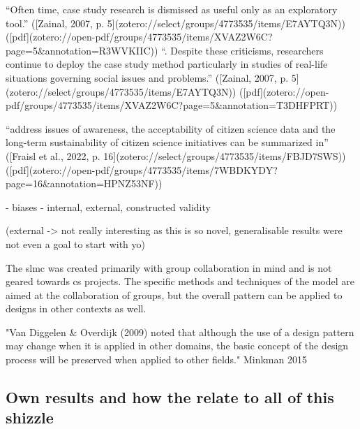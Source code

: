 “Often time, case study research is dismissed as useful only as an exploratory tool.” ([Zainal, 2007, p. 5](zotero://select/groups/4773535/items/E7AYTQ3N)) ([pdf](zotero://open-pdf/groups/4773535/items/XVAZ2W6C?page=5&annotation=R3WVKIIC)) %
“. Despite these criticisms, researchers continue to deploy the case study method particularly in studies of real-life situations governing social issues and problems.” ([Zainal, 2007, p. 5](zotero://select/groups/4773535/items/E7AYTQ3N)) ([pdf](zotero://open-pdf/groups/4773535/items/XVAZ2W6C?page=5&annotation=T3DHFPRT))


“address issues of awareness, the acceptability of citizen science data and the long-term sustainability of citizen science initiatives can be summarized in” ([Fraisl et al., 2022, p. 16](zotero://select/groups/4773535/items/FBJD7SWS)) ([pdf](zotero://open-pdf/groups/4773535/items/7WBDKYDY?page=16&annotation=HPNZ53NF))


- biases
- internal, external, constructed validity 

(external -> not really interesting as this is so novel, generalisable results were not even a goal to start with yo)

The \acrfull{slmc} was created primarily with group collaboration in mind and is not geared towards \acrshort*{cs} projects. The specific methods and techniques of the model are aimed at the collaboration of groups, but the overall pattern can be applied to designs in other contexts as well. 

"Van Diggelen & Overdijk (2009) noted that although the use of a design pattern may change when it is applied in other domains, the basic concept of the design process will be preserved when applied to other fields." Minkman 2015

\subsection{Own results and how the relate to all of this shizzle}








